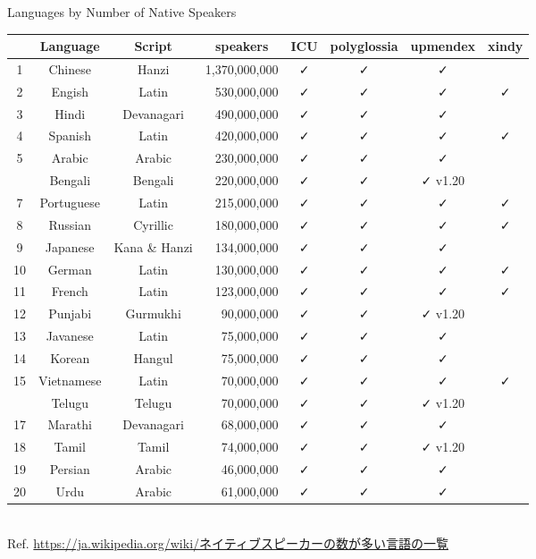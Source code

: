 \documentclass[aspectratio=169,10pt]{beamer}
\newcommand{\colRd}{\color{purple}}
\newcommand{\colGn}{\color{teal}}
\newcommand{\colBl}{\color{blue}}
\begin{document}
\begin{frame}{Languages by Number of Native Speakers}

\setlength\dashlinedash{0.5pt}
\setlength\dashlinegap{1.0pt}

\begin{center}
\scriptsize
\begin{tabular}{ccc|r|cccc}
  & Language    & Script & \multicolumn{1}{c|}{speakers} & ICU & polyglossia & upmendex & xindy \\\hline\hline
1 & Chinese     & {\colRd Hanzi     } & 1,370,000,000 & ✓ & ✓ & ✓ &    \\
2 & Engish      & Latin      &   530,000,000 & ✓ & ✓ & ✓ & ✓ \\
3 & Hindi       & {\colBl Devanagari} &   490,000,000 & ✓ & ✓ & ✓ &    \\
4 & Spanish     & Latin      &   420,000,000 & ✓ & ✓ & ✓ & ✓ \\
5 & Arabic      & {\colGn Arabic    } &   230,000,000 & ✓ & ✓ & ✓ &    \\\hdashline
6 & Bengali     & {\colBl Bengali   } &   220,000,000 & ✓ & ✓ & {\colBl ✓ v1.20} &    \\
7 & Portuguese  & Latin      &   215,000,000 & ✓ & ✓ & ✓ & ✓ \\
8 & Russian     & Cyrillic   &   180,000,000 & ✓ & ✓ & ✓ & ✓ \\
9 & Japanese    & {\colRd Kana \& Hanzi } &   134,000,000 & ✓ & ✓ & ✓ &    \\
10 & German     & Latin      &   130,000,000 & ✓ & ✓ & ✓ & ✓ \\\hline
11 & French     & Latin      &   123,000,000 & ✓ & ✓ & ✓ & ✓ \\
12 & Punjabi    & {\colBl Gurmukhi  } &    90,000,000 & ✓ & ✓ & {\colBl ✓ v1.20} &    \\
13 & Javanese   & Latin      &    75,000,000 & ✓ & ✓ & ✓ &    \\
14 & Korean     & {\colRd Hangul    } &    75,000,000 & ✓ & ✓ & ✓ &    \\
15 & Vietnamese & Latin      &    70,000,000 & ✓ & ✓ & ✓ & ✓ \\\hdashline
16 & Telugu     & {\colBl Telugu    } &    70,000,000 & ✓ & ✓ & {\colBl ✓ v1.20} &    \\
17 & Marathi    & {\colBl Devanagari} &    68,000,000 & ✓ & ✓ & ✓ &    \\
18 & Tamil      & {\colBl Tamil     } &    74,000,000 & ✓ & ✓ & {\colBl ✓ v1.20} &    \\
19 & Persian    & {\colGn Arabic    } &    46,000,000 & ✓ & ✓ & ✓ &    \\
20 & Urdu       & {\colGn Arabic    } &    61,000,000 & ✓ & ✓ & ✓ &    \\\hline
\end{tabular}
\\
{\tiny Ref. \url{https://ja.wikipedia.org/wiki/ネイティブスピーカーの数が多い言語の一覧}}
\end{center}
\end{frame}
\end{document}
